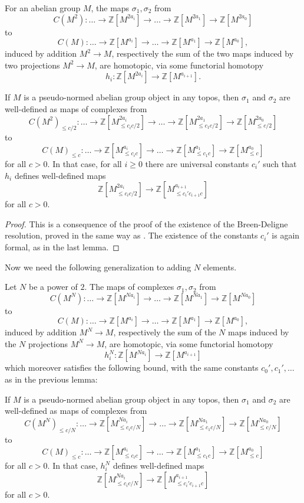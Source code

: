 \begin{lemma}\label{basehomotopy} For an abelian group $M$, the maps $\sigma_1,\sigma_2$ from
\[
C(M^2): \ldots \to \mathbb Z[M^{2a_i}]\to\ldots\to\mathbb Z[M^{2a_1}]\to\mathbb Z[M^{2a_0}]
\]
to
\[
C(M): \ldots \to \mathbb Z[M^{a_i}]\to\ldots\to\mathbb Z[M^{a_1}]\to\mathbb Z[M^{a_0}],
\]
induced by addition $M^2\to M$, respectively the sum of the two maps induced by two projections $M^2\to M$, are homotopic, via some functorial homotopy
\[
h_i: \mathbb Z[M^{2a_i}]\to \mathbb Z[M^{a_{i+1}}].
\]

If $M$ is a pseudo-normed abelian group object in any topos, then $\sigma_1$ and $\sigma_2$ are well-defined as maps of complexes from
\[
C(M^2)_{\leq c/2}: \ldots \to \mathbb Z[M^{2a_i}_{\leq c_ic/2}]\to\ldots\to\mathbb
Z[M^{2a_1}_{\leq c_1c/2}]\to\mathbb Z[M^{2a_0}_{\leq c/2}]
\]
to
\[
C(M)_{\leq c}: \ldots \to \mathbb Z[M^{a_i}_{\leq c_ic}]\to\ldots\to\mathbb
Z[M^{a_1}_{\leq c_1c}]\to\mathbb Z[M^{a_0}_{\leq c}]
\]
for all $c>0$. In that case, for all $i\geq 0$ there are universal constants $c_i'$ such that $h_i$ defines well-defined maps
\[
\mathbb Z[M^{2a_i}_{\leq c_ic/2}]\to \mathbb Z[M^{a_{i+1}}_{\leq
c_i'c_{i+1}c}]
\]
for all $c>0$.
\end{lemma}

\begin{proof} This is a consequence of the proof of the existence of the Breen-Deligne resolution, proved in the same way as \cite[Proposition 4.17]{Condensed}. The existence of the constants $c_i'$ is again formal, as in the last lemma.
\end{proof}

Now we need the following generalization to adding $N$ elements.

\begin{lemma}\label{homotopyNelements} Let $N$ be a power of $2$. The maps of complexes $\sigma_1,\sigma_2$ from
\[
C(M^N): \ldots \to \mathbb Z[M^{Na_i}]\to\ldots\to\mathbb Z[M^{Na_1}]\to\mathbb Z[M^{Na_0}]
\]
to
\[
C(M): \ldots \to \mathbb Z[M^{a_i}]\to\ldots\to\mathbb Z[M^{a_1}]\to\mathbb Z[M^{a_0}],
\]
induced by addition $M^N\to M$, respectively the sum of the $N$ maps induced by the $N$ projections $M^N\to M$, are homotopic, via some functorial homotopy
\[
h_i^N: \mathbb Z[M^{Na_i}]\to \mathbb Z[M^{a_{i+1}}]
\]
which moreover satisfies the following bound, with the same constants $c_0',c_1',\ldots$ as in the previous lemma:

If $M$ is a pseudo-normed abelian group object in any topos, then $\sigma_1$ and $\sigma_2$ are well-defined as maps of complexes from
\[
C(M^N)_{\leq c/N}: \ldots \to \mathbb Z[M^{Na_i}_{\leq c_ic/N}]\to\ldots\to\mathbb Z[M^{Na_1}_{\leq c_1c/N}]\to\mathbb Z[M^{Na_0}_{\leq c/N}]
\]
to
\[
C(M)_{\leq c}: \ldots \to \mathbb Z[M^{a_i}_{\leq c_ic}]\to\ldots\to\mathbb Z[M^{a_1}_{\leq c_1c}]\to\mathbb Z[M^{a_0}_{\leq c}]
\]
for all $c>0$. In that case, $h_i^N$ defines well-defined maps
\[
\mathbb Z[M^{Na_i}_{\leq c_ic/N}]\to \mathbb Z[M^{a_{i+1}}_{\leq c_i'c_{i+1}c}]
\]
for all $c>0$.
\end{lemma}

